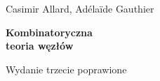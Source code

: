 

\thispagestyle{empty}
{\noindent\fontsize{18pt}{18pt}\selectfont Casimir Allard, Adélaïde Gauthier}

\noindent\makebox[\linewidth]{\rule{\textwidth}{1pt}}

\vspace{10mm}

{\noindent\fontsize{24pt}{24pt}\selectfont \textbf{Kombinatoryczna\\teoria węzłów}}
\vspace{10mm}

{\noindent\fontsize{14pt}{14pt}\selectfont Wydanie trzecie poprawione}

\newpage


